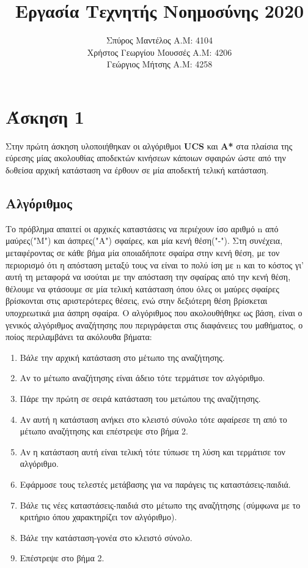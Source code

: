 \documentclass{article}
\title{Εργασία Τεχνητής Νοημοσύνης 2020}
\author{Σπύρος Μαντέλος Α.Μ: 4104\\Χρήστος Γεωργίου Μουσσές Α.Μ: 4206\\Γεώργιος Μήτσης Α.Μ: 4258}
\date{}
\begin{document}
    \maketitle
    
    \section*{Άσκηση 1}
        Στην πρώτη άσκηση υλοποιήθηκαν οι αλγόριθμοι \textbf{UCS} και \textbf{A*} στα πλαίσια της εύρεσης μίας ακολουθίας αποδεκτών κινήσεων κάποιων σφαιρών ώστε από την δoθείσα αρχική κατάσταση να έρθουν σε μία αποδεκτή τελική κατάσταση.
   
    \subsection*{Αλγόριθμος}
        Το πρόβλημα απαιτεί οι αρχικές καταστάσεις να περιέχουν ίσο αριθμό n από μαύρες("Μ") και άσπρες("Α") σφαίρες, και μία κενή θέση("-"). Στη συνέχεια, μεταφέροντας σε κάθε βήμα μία οποιαδήποτε σφαίρα στην κενή θέση, με τον περιορισμό ότι η απόσταση μεταξύ τους να είναι το πολύ ίση με n και το κόστος γι' αυτή τη μεταφορά να ισούται με την απόσταση την σφαίρας από την κενή θέση, θέλουμε να φτάσουμε σε μία τελική κατάσταση όπου όλες οι μαύρες σφαίρες βρίσκονται στις αριστερότερες θέσεις, ενώ στην δεξιότερη θέση βρίσκεται υποχρεωτικά μια άσπρη σφαίρα.
        Ο αλγόριθμος που ακολουθήθηκε ως βάση, είναι ο γενικός αλγόριθμος αναζήτησης που περιγράφεται στις διαφάνειες του μαθήματος, ο ποίος περιλαμβάνει τα ακόλουθα βήματα:
        \begin{enumerate}
          \item Βάλε την αρχική κατάσταση στο μέτωπο της αναζήτησης.
          \item Αν το μέτωπο αναζήτησης είναι άδειο τότε τερμάτισε τον αλγόριθμο.
          \item Πάρε την πρώτη σε σειρά κατάσταση του μετώπου της αναζήτησης.
          \item Αν αυτή η κατάσταση ανήκει στο κλειστό σύνολο τότε αφαίρεσε τη από το μέτωπο αναζήτησης και επέστρεψε στο βήμα 2. 
          \item Αν η κατάσταση αυτή  είναι τελική τότε τύπωσε τη λύση και τερμάτισε τον αλγόριθμο.
          \item Εφάρμοσε τους τελεστές μετάβασης για να παράγεις τις καταστάσεις-παιδιά.
          \item Βάλε τις νέες καταστάσεις-παιδιά στο μέτωπο της αναζήτησης (σύμφωνα με το κριτήριο όπου χαρακτηρίζει τον αλγόριθμο).
          \item Βάλε την κατάσταση-γονέα στο κλειστό σύνολο. 
          \item Επέστρεψε στο βήμα 2.
        \end{enumerate}
\end{document}

